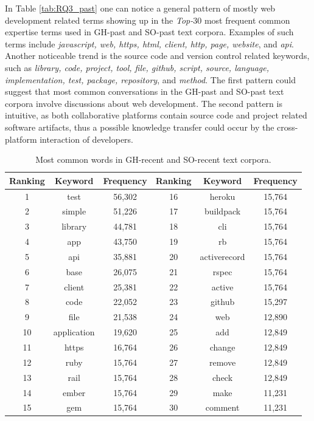         In Table \ref{tab:RQ3_past} one can notice a general pattern of mostly web development related terms showing up in the \emph{Top-$30$} most frequent common expertise terms used in GH-past and SO-past text corpora. Examples of such terms include \emph{javascript, web, https, html, client, http, page, website}, and \emph{api}. Another noticeable trend is the source code and version control related keywords, such as \emph{library, code, project, tool, file, github, script, source, language, implementation, test, package, repository}, and \emph{method}. The first pattern could suggest that most common conversations in the GH-past and SO-past text corpora involve discussions about web development. The second pattern is intuitive, as both collaborative platforms contain source code and project related software artifacts, thus a possible knowledge transfer could occur by the cross-platform interaction of developers. 
        
        \begin{table}
          \centering
          \caption{Most common words in GH-recent and SO-recent text corpora.}\label{tab:RQ3_recent}
            \vspace{6pt} %
          \begin{tabular}{|c c c | c c c|}
            \hline
            Ranking & Keyword & Frequency & Ranking & Keyword & Frequency \\
            \hline\hline
            1 & test & 56,302 & 16 & heroku & 15,764 \\
            2 & simple & 51,226 & 17 & buildpack & 15,764 \\
            3 & library & 44,781 & 18 & cli & 15,764 \\
            4 & app & 43,750 & 19 & rb & 15,764 \\
            5 & api & 35,881 & 20 & activerecord & 15,764 \\
            6 & base & 26,075 & 21 & rspec & 15,764 \\
            7 & client & 25,381 & 22 & active & 15,764 \\
            8 & code & 22,052 & 23 & github & 15,297 \\
            9 & file & 21,538 & 24 & web & 12,890 \\
            10 & application & 19,620 & 25 & add & 12,849 \\
            11 & https & 16,764 & 26 & change & 12,849\\
            12 & ruby & 15,764  & 27 & remove & 12,849 \\
            13 & rail & 15,764 & 28 & check & 12,849\\
            14 & ember & 15,764 & 29 & make & 11,231 \\
            15 & gem & 15,764 & 30 & comment & 11,231\\
            \hline
          \end{tabular}
        \end{table}
        
